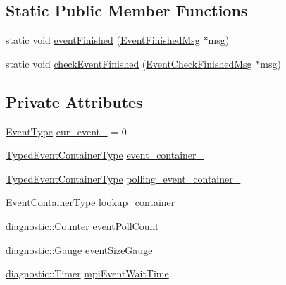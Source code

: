 \subsection*{Static Public Member Functions}
\begin{DoxyCompactItemize}
\item 
static void \hyperlink{structvt_1_1event_1_1_async_event_a2228d79f1c1f838e630dcb3325edfde3}{event\+Finished} (\hyperlink{structvt_1_1_event_finished_msg}{Event\+Finished\+Msg} $\ast$msg)
\item 
static void \hyperlink{structvt_1_1event_1_1_async_event_a5493f4402db0fffba5300246247523b9}{check\+Event\+Finished} (\hyperlink{structvt_1_1_event_check_finished_msg}{Event\+Check\+Finished\+Msg} $\ast$msg)
\end{DoxyCompactItemize}
\subsection*{Private Attributes}
\begin{DoxyCompactItemize}
\item 
\hyperlink{namespacevt_a009267401def7ae8bf201892222d060f}{Event\+Type} \hyperlink{structvt_1_1event_1_1_async_event_a8775e8bb7eee0344126af34897ca7612}{cur\+\_\+event\+\_\+} = 0
\item 
\hyperlink{structvt_1_1event_1_1_async_event_af0397f32fb9d7dd136c544737eeb7796}{Typed\+Event\+Container\+Type} \hyperlink{structvt_1_1event_1_1_async_event_ab976472ed1ec00878dfad854d0a74202}{event\+\_\+container\+\_\+}
\item 
\hyperlink{structvt_1_1event_1_1_async_event_af0397f32fb9d7dd136c544737eeb7796}{Typed\+Event\+Container\+Type} \hyperlink{structvt_1_1event_1_1_async_event_aa622d9e34d70a6de6ca74b16e65c1bae}{polling\+\_\+event\+\_\+container\+\_\+}
\item 
\hyperlink{structvt_1_1event_1_1_async_event_a391e9ac6236bd3dc5c884b8bc7e48257}{Event\+Container\+Type} \hyperlink{structvt_1_1event_1_1_async_event_a8810ca30cca503944aed2741a6d28430}{lookup\+\_\+container\+\_\+}
\item 
\hyperlink{namespacevt_1_1diagnostic_a55fcc9d6ffa285d1b085c01df2507d2f}{diagnostic\+::\+Counter} \hyperlink{structvt_1_1event_1_1_async_event_a2699d7c273fc91d9b7a3c51fbae364d9}{event\+Poll\+Count}
\item 
\hyperlink{namespacevt_1_1diagnostic_ad68069af499e2047c28d1852d77680ee}{diagnostic\+::\+Gauge} \hyperlink{structvt_1_1event_1_1_async_event_a8fc0ec877d847df0ac290c330146fd8a}{event\+Size\+Gauge}
\item 
\hyperlink{namespacevt_1_1diagnostic_a84795feb3d3500ee2d7d59248499efb8}{diagnostic\+::\+Timer} \hyperlink{structvt_1_1event_1_1_async_event_a09ed5cc72e0c43fa1de10ccb4effd7df}{mpi\+Event\+Wait\+Time}
\end{DoxyCompactItemize}
